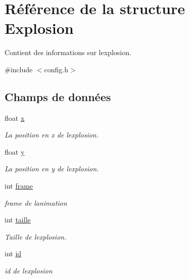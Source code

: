 \hypertarget{struct_explosion}{}\section{Référence de la structure Explosion}
\label{struct_explosion}


Contient des informations sur l\textquotesingle{}explosion.  




{\ttfamily \#include $<$config.\+h$>$}

\subsection*{Champs de données}
\begin{DoxyCompactItemize}
\item 
float \hyperlink{struct_explosion_acae310a04fa43cd9aac6c54ca0c58ac2}{x}
\begin{DoxyCompactList}\small\item\em La position en x de l\textquotesingle{}explosion. \end{DoxyCompactList}\item 
float \hyperlink{struct_explosion_ac51df5775e258c0a7d77e0edf9589760}{y}
\begin{DoxyCompactList}\small\item\em La position en y de l\textquotesingle{}explosion. \end{DoxyCompactList}\item 
int \hyperlink{struct_explosion_abf2153564f65733e9acde4d938cb0489}{frame}
\begin{DoxyCompactList}\small\item\em frame de l\textquotesingle{}animation \end{DoxyCompactList}\item 
int \hyperlink{struct_explosion_aa370d70c935c422014a3a5760e20b8a9}{taille}
\begin{DoxyCompactList}\small\item\em Taille de l\textquotesingle{}explosion. \end{DoxyCompactList}\item 
int \hyperlink{struct_explosion_a65d1b7dd9af207c3dc75cd106e2b0524}{id}
\begin{DoxyCompactList}\small\item\em id de l\textquotesingle{}explosion \end{DoxyCompactList}\end{DoxyCompactItemize}



